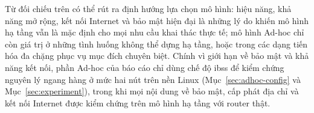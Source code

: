 Từ đối chiếu trên có thể rút ra định hướng lựa chọn mô hình: hiệu năng, khả năng
mở rộng, kết nối Internet và bảo mật hiện đại là những lý do khiến mô hình hạ
tầng vẫn là mặc định cho mọi nhu cầu khai thác thực tế; mô hình Ad-hoc chỉ còn
giá trị ở những tình huống không thể dựng hạ tầng, hoặc trong các dạng tiến hóa
đa chặng phục vụ mục đích chuyên biệt. Chính vì giới hạn về bảo mật và khả năng
kết nối, phần Ad-hoc của báo cáo chỉ dùng chế độ \ac{ibss} để kiểm chứng nguyên
lý ngang hàng ở mức hai nút trên nền Linux
(Mục~\ref{sec:adhoc-config} và Mục~\ref{sec:experiment}), trong khi mọi nội dung
về bảo mật, cấp phát địa chỉ và kết nối Internet được kiểm chứng trên mô hình hạ
tầng với router thật.

\endgroup
